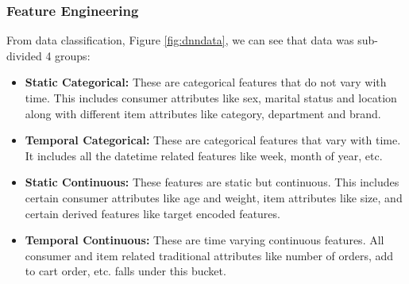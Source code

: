 \subsubsection{Feature Engineering}
From data classification, Figure \ref{fig:dnndata}, we can see that data was sub-divided 4 groups:
\begin{itemize}
\item {\bf Static Categorical:} These are categorical features that do not vary with time. This includes consumer
attributes like sex, marital status and location along with different item attributes like category, department and brand.
\item {\bf Temporal Categorical:} These are categorical features that vary with time. It includes all the datetime 
related features like week, month of year, etc.
\item {\bf Static Continuous:} These features are static but continuous. This includes certain consumer attributes like
age and weight, item attributes like size, and certain derived features like target encoded features.
\item {\bf Temporal Continuous:} These are time varying continuous features. All consumer and item related
traditional attributes like number of orders, add to cart order, etc. falls under this bucket.
\end{itemize}
